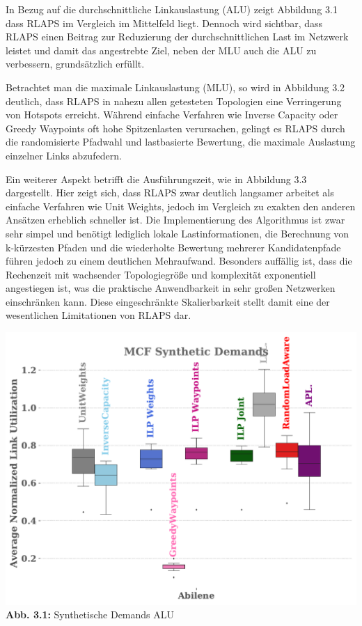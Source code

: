 In Bezug auf die durchschnittliche Linkauslastung (ALU) zeigt Abbildung 3.1 dass RLAPS im Vergleich im Mittelfeld liegt. Dennoch wird sichtbar, dass RLAPS einen Beitrag zur Reduzierung der durchschnittlichen Last im Netzwerk leistet und damit das angestrebte Ziel, neben der MLU auch die ALU zu verbessern, grundsätzlich erfüllt.

Betrachtet man die maximale Linkauslastung (MLU), so wird in Abbildung 3.2 deutlich, dass RLAPS in nahezu allen getesteten Topologien  eine Verringerung von Hotspots erreicht. Während einfache Verfahren wie Inverse Capacity oder Greedy Waypoints oft hohe Spitzenlasten verursachen, gelingt es RLAPS durch die randomisierte Pfadwahl und lastbasierte Bewertung, die maximale Auslastung einzelner Links abzufedern.

Ein weiterer Aspekt betrifft die Ausführungszeit, wie in Abbildung 3.3 dargestellt. Hier zeigt sich, dass RLAPS zwar deutlich langsamer arbeitet als einfache Verfahren wie Unit Weights, jedoch im Vergleich zu exakten den anderen Ansätzen erheblich schneller ist. Die Implementierung des Algorithmus ist zwar sehr simpel und benötigt lediglich lokale Lastinformationen, die Berechnung von k-kürzesten Pfaden und die wiederholte Bewertung mehrerer Kandidatenpfade führen jedoch zu einem deutlichen Mehraufwand. Besonders auffällig ist, dass die Rechenzeit mit wachsender Topologiegröße und komplexität exponentiell angestiegen ist, was die praktische Anwendbarkeit in sehr großen Netzwerken einschränken kann. Diese eingeschränkte Skalierbarkeit stellt damit eine der wesentlichen Limitationen von RLAPS dar.

\begin{center}
        \centering
        \includegraphics[width=\textwidth]{Report/bilder/RLAPS/all_algorithms_abilene_objective_alu.pdf}
        \small\textbf{Abb. 3.1:} Synthetische Demands ALU
        \label{fig:enter-label}
\end{center}

